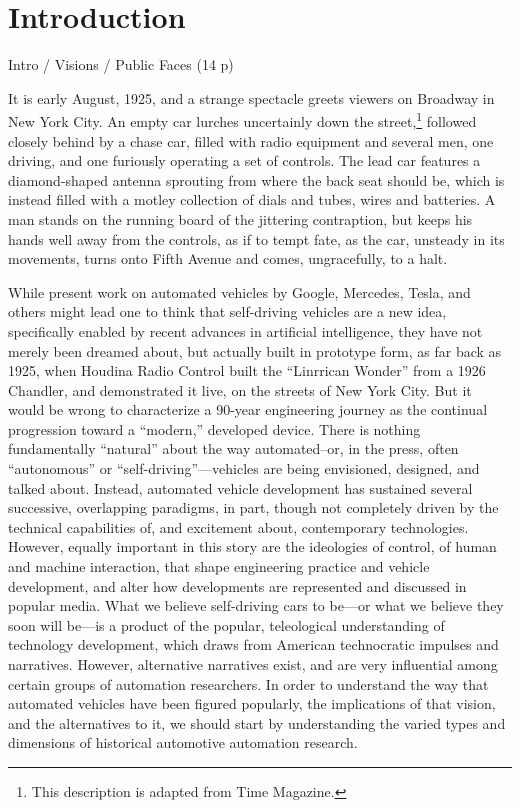 \chapter{Introduction}
\label{chap:1}

Intro / Visions / Public Faces (14 p)

It is early August, 1925, and a strange spectacle greets viewers on
Broadway in New York City. An empty car lurches uncertainly down the
street,\footnote{This description is adapted from Time
  Magazine\cite{???-Science-radio-auto}.} followed closely behind by a
chase car, filled with radio equipment and several men, one driving,
and one furiously operating a set of controls. The lead car features a
diamond-shaped antenna sprouting from where the back seat should be,
which is instead filled with a motley collection of dials and tubes,
wires and batteries. A man stands on the running board of the
jittering contraption, but keeps his
hands well away from the controls, as if to tempt fate, as the car,
unsteady in its movements, turns onto Fifth Avenue and comes,
ungracefully, to a halt.

While present work on automated vehicles by Google, Mercedes, Tesla,
and others might lead one to think that self-driving vehicles are a
new idea, specifically enabled by recent advances in artificial
intelligence, they have not merely been dreamed about, but actually
built in prototype form, as far back as 1925, when Houdina Radio Control
built the ``Linrrican Wonder'' from a 1926 Chandler, and demonstrated
it live, on the streets of New York City. But it would be wrong to
characterize a 90-year engineering journey as the continual
progression toward a ``modern,'' developed device. There is nothing
fundamentally ``natural'' about the way automated--or, in the press,
often ``autonomous'' or ``self-driving''---vehicles are being
envisioned, designed, and talked about. Instead, automated vehicle
development has sustained several successive, overlapping paradigms,
in part, though not completely driven by the technical capabilities
of, and excitement about, contemporary technologies. However, equally
important in this story are the ideologies of control, of human and
machine interaction, that shape engineering practice and vehicle
development, and alter how developments are represented and discussed
in popular media. What we believe self-driving cars to be---or what we
believe they soon will be---is a product of the popular, teleological understanding
of technology development, which draws from American technocratic
impulses and narratives. However, alternative narratives exist, and
are very influential among certain groups of automation researchers. In
order to understand the way that automated vehicles have been figured
popularly, the implications of that vision, and the alternatives to
it, we should start by understanding the varied types and dimensions
of historical automotive automation research.


